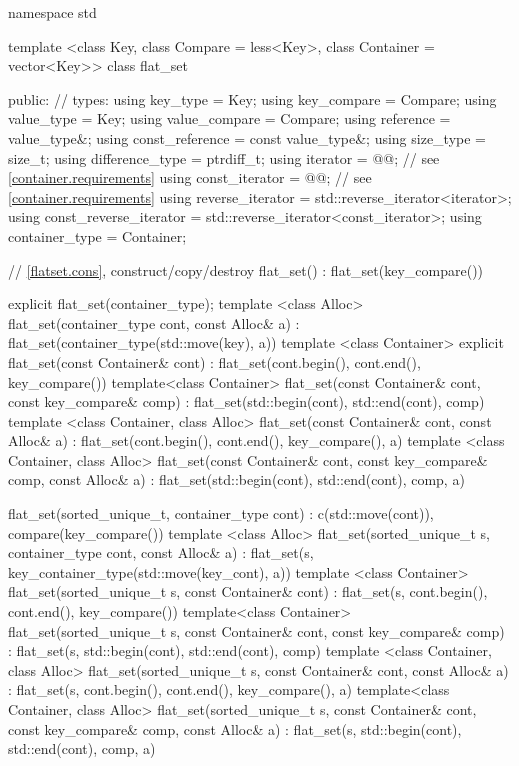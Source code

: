 \begin{codeblock}
\begin{codeblock}
\begin{codeblock}
\begin{addedblock}
\begin{codeblock}
namespace std {
  template <class Key, class Compare = less<Key>, class Container = vector<Key>>
  class flat_set {
  public:
    // types:
    using key_type                  = Key;
    using key_compare               = Compare;
    using value_type                = Key;
    using value_compare             = Compare;
    using reference                 = value_type&;
    using const_reference           = const value_type&;
    using size_type                 = size_t;
    using difference_type           = ptrdiff_t;
    using iterator                  = @@; // see \ref{container.requirements}
    using const_iterator            = @@; // see \ref{container.requirements}
    using reverse_iterator          = std::reverse_iterator<iterator>;
    using const_reverse_iterator    = std::reverse_iterator<const_iterator>;
    using container_type            = Container;

    // \ref{flatset.cons}, construct/copy/destroy
    flat_set() : flat_set(key_compare()) { }

    explicit flat_set(container_type);
    template <class Alloc>
      flat_set(container_type cont, const Alloc& a)
        : flat_set(container_type(std::move(key), a)) { }
    template <class Container>
      explicit flat_set(const Container& cont)
        : flat_set(cont.begin(), cont.end(), key_compare()) { }
    template<class Container>
    flat_set(const Container& cont, const key_compare& comp)
        : flat_set(std::begin(cont), std::end(cont), comp) { }
    template <class Container, class Alloc>
      flat_set(const Container& cont, const Alloc& a)
        : flat_set(cont.begin(), cont.end(), key_compare(), a) { }
    template <class Container, class Alloc>
      flat_set(const Container& cont, const key_compare& comp, const Alloc& a)
        : flat_set(std::begin(cont), std::end(cont), comp, a) { }

    flat_set(sorted_unique_t, container_type cont)
      : c(std::move(cont)), compare(key_compare()) { }
    template <class Alloc>
      flat_set(sorted_unique_t s, container_type cont, const Alloc& a)
        : flat_set(s, key_container_type(std::move(key_cont), a)) { }
    template <class Container>
      flat_set(sorted_unique_t s, const Container& cont)
        : flat_set(s, cont.begin(), cont.end(), key_compare()) { }
    template<class Container>
    flat_set(sorted_unique_t s, const Container& cont, const key_compare& comp)
        : flat_set(s, std::begin(cont), std::end(cont), comp) { }
    template <class Container, class Alloc>
      flat_set(sorted_unique_t s, const Container& cont, const Alloc& a)
        : flat_set(s, cont.begin(), cont.end(), key_compare(), a) { }
    template<class Container, class Alloc>
    flat_set(sorted_unique_t s, const Container& cont, const key_compare& comp, const Alloc& a)
        : flat_set(s, std::begin(cont), std::end(cont), comp, a) { }

}}
\end{codeblock}
\end{addedblock}
\end{codeblock}
\end{codeblock}
\end{codeblock}
